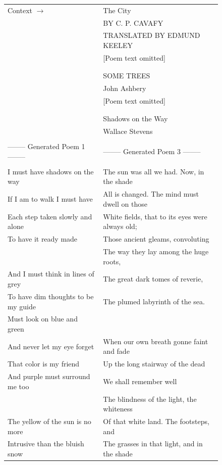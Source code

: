 \documentclass{article}
\begin{document}
\begin{figure} { \tt \scriptsize \begin{center}\begin{tabular}{l l} \toprule Context $\to$ & The City \\
& BY C. P. CAVAFY  \\ 
& TRANSLATED BY EDMUND KEELEY \\
& [Poem text omitted] \\
 \\ \\
& SOME TREES \\
& John Ashbery \\
& [Poem text omitted] \\
 \\ \\ 
& Shadows on the Way \\
& Wallace Stevens \\
\midrule  
 & \\
 -------- Generated Poem 1  -------- &  -------- Generated Poem 3  -------- \\
 & \\
I must have shadows on the way & The sun was all we had. Now, in the shade\\
If I am to walk I must have & All is changed. The mind must dwell on those\\
Each step taken slowly and alone & White fields, that to its eyes were always old;\\
To have it ready made & Those ancient gleams, convoluting\\
 & The way they lay among the huge roots,\\
And I must think in lines of grey & The great dark tomes of reverie,\\
To have dim thoughts to be my guide & The plumed labyrinth of the sea.\\
Must look on blue and green & \\
And never let my eye forget & When our own breath gonne faint and fade\\
That color is my friend & Up the long stairway of the dead\\
And purple must surround me too & We shall remember well\\
 & The blindness of the light, the whiteness\\
The yellow of the sun is no more & Of that white land. The footsteps, and\\
Intrusive than the bluish snow & The grasses in that light, and in the shade\\

\end{tabular}
\end{center}}
\end{figure}
\end{document}
